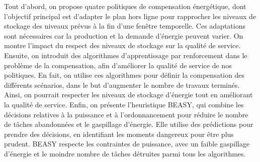 Tout d'abord, on propose quatre politiques de compensation énergétique, dont l'objectif principal est d'adapter le plan hors ligne pour rapprocher les niveaux de stockage des niveaux prévus à la fin d'une fenêtre temporelle. Ces adaptations sont nécessaires car la production et la demande d'énergie peuvent varier. On montre l'impact du respect des niveaux de stockage sur la qualité de service. Ensuite, on introduit des algorithmes d'apprentissage par renforcement dans le problème de la compensation, afin d'améliorer la qualité de service de nos politiques. En fait, on utilise ces algorithmes pour définir la compensation des différents scénarios, dans le but d'augmenter le nombre de travaux terminés. Ainsi, on pourrait respecter les niveaux de stockage d'énergie tout en améliorant la qualité de service. Enfin, on présente l'heuristique BEASY, qui combine les décisions relatives à la puissance et à l'ordonnancement pour réduire le nombre de tâches abandonnées et le gaspillage d'énergie. Elle utilise des prédictions pour prendre des décisions, en identifiant les moments dangereux pour être plus prudent. BEASY respecte les contraintes de puissance, avec un faible gaspillage d'énergie et le moindre nombre de tâches détruites parmi tous les algorithmes.
